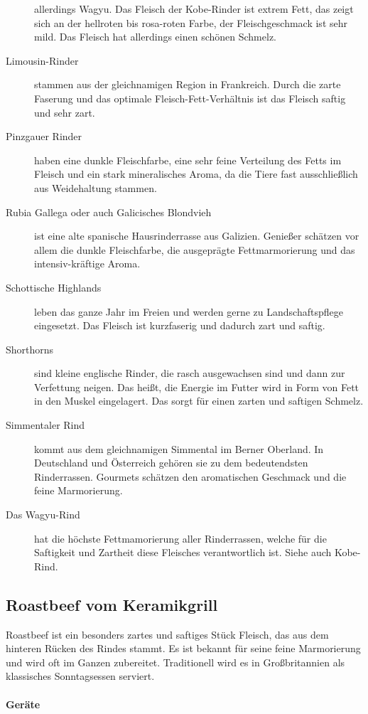 \begin{description}
	allerdings Wagyu. Das Fleisch der Kobe-Rinder ist extrem Fett, das 
	zeigt sich an der hellroten bis rosa-roten Farbe, der Fleischgeschmack 
	ist sehr mild. Das Fleisch hat allerdings einen schönen Schmelz.
	\item[Limousin-Rinder] stammen aus der gleichnamigen Region in 
	Frankreich. Durch die zarte Faserung und das optimale 
	Fleisch-Fett-Verhältnis ist das Fleisch saftig und sehr zart.
	\item [Pinzgauer Rinder] haben eine dunkle Fleischfarbe, eine sehr 
	feine Verteilung des Fetts im Fleisch und ein stark mineralisches 
	Aroma, da die Tiere fast ausschließlich aus Weidehaltung stammen.
	\item [Rubia Gallega oder auch Galicisches Blondvieh] ist eine alte 
	spanische Hausrinderrasse aus Galizien. Genießer schätzen vor allem 
	die dunkle Fleischfarbe, die ausgeprägte Fettmarmorierung und das 
	intensiv-kräftige Aroma.
	\item [Schottische Highlands] leben das ganze Jahr im Freien und 
	werden gerne zu Landschaftspflege eingesetzt. Das Fleisch ist 
	kurzfaserig und dadurch zart und saftig.
	\item[Shorthorns] sind kleine englische Rinder, die rasch 
	ausgewachsen sind und dann zur Verfettung neigen. Das heißt, die 
	Energie im Futter wird in Form von Fett in den Muskel eingelagert. Das 
	sorgt für einen zarten und saftigen Schmelz.
	\item[Simmentaler Rind] kommt aus dem gleichnamigen Simmental im 
	Berner Oberland. In Deutschland und Österreich gehören sie zu dem 
	bedeutendsten Rinderrassen. Gourmets schätzen den aromatischen 
	Geschmack und die feine Marmorierung.
	\item[Das Wagyu-Rind] hat die höchste Fettmamorierung aller 
	Rinderrassen, welche für die Saftigkeit und Zartheit diese Fleisches 
	verantwortlich ist. Siehe auch Kobe-Rind.
\end{description}

\subsection{Roastbeef vom Keramikgrill}
Roastbeef ist ein besonders zartes und saftiges Stück Fleisch, das aus 
dem hinteren Rücken des Rindes stammt. Es ist bekannt für seine feine 
Marmorierung und wird oft im Ganzen zubereitet. Traditionell wird es in 
Großbritannien als klassisches Sonntagsessen serviert. 

\paragraph{Geräte}

